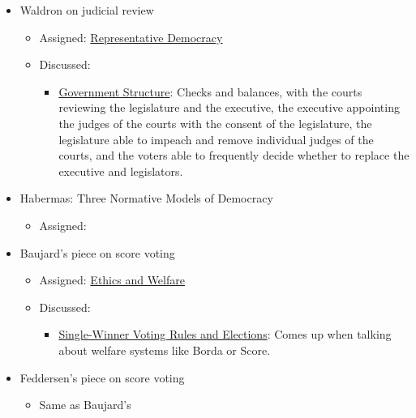 \begin{itemize}
    \item Waldron on judicial review \autocite{Waldron1998}
    \begin{itemize}
        \item Assigned: \hyperref[cur:representative-democracy]{Representative Democracy}
        \item Discussed:
        \begin{itemize}
            \item \hyperref[cur:government-structure]{Government Structure}:  Checks and balances, with the courts reviewing the legislature and the executive, the executive appointing the judges of the courts with the consent of the legislature, the legislature able to impeach and remove individual judges of the courts, and the voters able to frequently decide whether to replace the executive and legislators.
        \end{itemize}
    \end{itemize}

    \item Habermas:  Three Normative Models of Democracy \autocite{Habermas1994}
    \begin{itemize}
        \item Assigned:
    \end{itemize}

    \item Baujard's piece on score voting \autocite{Baujard2014}
    \begin{itemize}
        \item Assigned:  \hyperref[cur:ethics]{Ethics and Welfare}
        \item Discussed:
        \begin{itemize}
            \item \hyperref[cur:single-winner-voting-rules]{Single-Winner Voting Rules and Elections}:  Comes up when talking about welfare systems like Borda or Score.
        \end{itemize}
    \end{itemize}

    \item Feddersen's piece on score voting \autocite{Feddersen2009}
    \begin{itemize}
        \item Same as Baujard's
    \end{itemize}

\end{itemize}